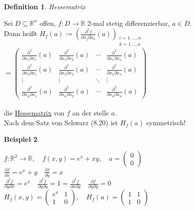 \documentclass[a4paper,11pt]{article}
\newtheorem{definition}{Definition}[section]
\newtheorem{bsp}[definition]{Beispiel}
\begin{document}
\begin{definition}
	Hessematrix
\end{definition}
Sei $D\subseteq\mathbb{R}^n$ offen, $f\colon D\to\mathbb{R}$ 2-mal stetig differenzierbar, $a\in D$. \\
Dann heißt $H_f(a):=(\frac{\partial^2 f}{\partial x_j\partial x_k}(a))_{\substack{i=1,...,n\\ k=1,..,n}}$\\
$=\begin{pmatrix}\frac{\partial^2}{\partial x_1\partial x_1}(a) & \frac{\partial^2}{\partial x_1\partial x_2}(a) & \cdots & \frac{\partial^2}{\partial x_1\partial x_n}(a) \\ \frac{\partial^2}{\partial x_2\partial x_1}(a) & \frac{\partial^2}{\partial x_2\partial x_2}(a) & \cdots & \frac{\partial^2}{\partial x_2\partial x_n}(a) \\ \vdots & \vdots & \ddots & \vdots \\ \frac{\partial^2}{\partial x_n\partial x_1}(a) & \frac{\partial^2}{\partial x_n\partial x_2}(a) & \cdots & \frac{\partial^2}{\partial x_n\partial x_n}(a)\end{pmatrix}$ \\ \\
die \underline{Hessematrix} von $f$ an der stelle $a$. \\
Nach dem Satz von Schwarz (8.20) ist $H_f(a)$ symmetrisch!

\begin{bsp}
\end{bsp}
$f\colon\mathbb{R}^2\to\mathbb{R},\quad f(x,y)=e^x+xy,\quad a=\begin{pmatrix}0\\0\end{pmatrix}$ \\
$\frac{\partial f}{\partial x}=e^x+y\quad\frac{\partial f}{\partial y}=x$ \\
$\frac{\partial^2f}{\partial y\partial x}=e^x\quad\frac{\partial^2f}{\partial y\partial y}=1=\frac{\partial^2f}{\partial x\partial y}\quad\frac{\partial f}{\partial y\partial y}=0$ \\
$H_f(x,y)=\begin{pmatrix}e^x&1\\1&0\end{pmatrix},\quad H_f(a)=\begin{pmatrix}1&1\\1&0\end{pmatrix}$

\newpage
\end{document}
